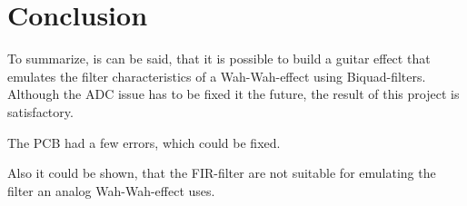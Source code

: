 \section{Conclusion}

To summarize, is can be said, that it is possible to build a guitar effect that emulates
the filter characteristics of a Wah-Wah-effect using Biquad-filters. Although the \ac{ADC} issue has to be fixed it
the future, the result of this project is satisfactory.

The \ac{PCB} had a few errors, which could be fixed.

Also it could be shown, that the \ac{FIR}-filter are not suitable for emulating the filter an analog Wah-Wah-effect
uses.

